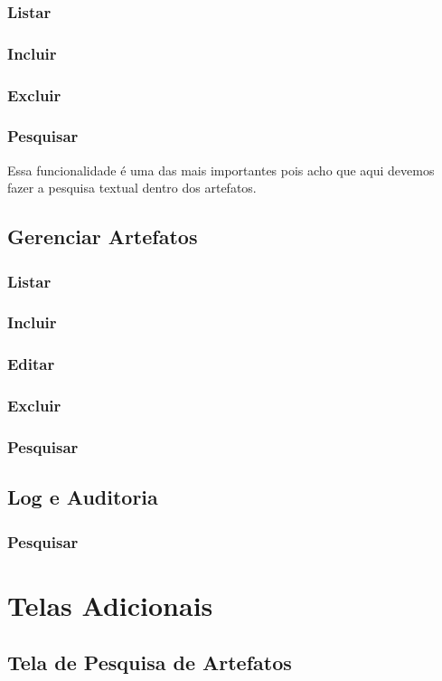 	\subsection{Listar}
	\subsection{Incluir}
	\subsection{Excluir}
	\subsection{Pesquisar}
	
	Essa funcionalidade é uma das mais importantes pois acho que aqui devemos fazer a pesquisa textual dentro dos artefatos.



\section{Gerenciar Artefatos \msrln}


	\subsection{Listar}
	\subsection{Incluir}
	\subsection{Editar}
	\subsection{Excluir}
	\subsection{Pesquisar}


\section{Log e Auditoria \msrln}


	\subsection{Pesquisar}


\chapter{Telas Adicionais}


\section{Tela de Pesquisa de Artefatos \msrln}




